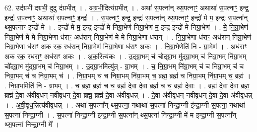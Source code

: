 \documentclass[17pt]{extarticle}
\begin{document}
62. उद॑ग्रभी दग्रभी॒ दुदु द॑ग्रभीत् । . अ॒ग्र॒भी॒दित्य॑ग्रभीत् । . अथा॑ स॒पत्ना᳚न् थ्स॒पत्नाꣳ॒॒ अथाथा॑ स॒पत्नाꣳ॒॒ इन्द्र॒ इन्द्रः॑ स॒पत्नाꣳ॒॒ अथाथा॑ स॒पत्नाꣳ॒॒ इन्द्रः॑ । . स॒पत्नाꣳ॒॒ इन्द्र॒ इन्द्रः॑ स॒पत्ना᳚न् थ्स॒पत्नाꣳ॒॒ इन्द्रो॑ मे म॒ इन्द्रः॑ स॒पत्ना᳚न् थ्स॒पत्नाꣳ॒॒ इन्द्रो॑ मे । . इन्द्रो॑ मे म॒ इन्द्र॒ इन्द्रो॑ मे निग्रा॒भेण॑ निग्रा॒भेण॑ म॒ इन्द्र॒ इन्द्रो॑ मे निग्रा॒भेण॑ । . मे॒ नि॒ग्रा॒भेण॑ निग्रा॒भेण॑ मे मे निग्रा॒भेणा ध॑राꣳ॒॒ अध॑रान् निग्रा॒भेण॑ मे मे निग्रा॒भेणा ध॑रान् । . नि॒ग्रा॒भेणा ध॑राꣳ॒॒ अध॑रान् निग्रा॒भेण॑ निग्रा॒भेणा ध॑राꣳ अक रक॒ रध॑रान् निग्रा॒भेण॑ निग्रा॒भेणा ध॑राꣳ अकः । . नि॒ग्रा॒भेणेति॑ नि - ग्रा॒भेण॑ । . अध॑राꣳ अक रक॒ रध॑राꣳ॒॒ अध॑राꣳ अकः । . अ॒क॒रित्य॑कः । . उ॒द्ग्रा॒भम् च॑ चोद्ग्रा॒भ मु॑द्ग्रा॒भम् च॑ निग्रा॒भम् नि॑ग्रा॒भम् चो᳚द्ग्रा॒भ मु॑द्ग्रा॒भम् च॑ निग्रा॒भम् । . उ॒द्ग्रा॒भमित्यु॑त् - ग्रा॒भम् । . च॒ नि॒ग्रा॒भम् नि॑ग्रा॒भम् च॑ च निग्रा॒भम् च॑ च निग्रा॒भम् च॑ च निग्रा॒भम् च॑ । . नि॒ग्रा॒भम् च॑ च निग्रा॒भम् नि॑ग्रा॒भम् च॒ ब्रह्म॒ ब्रह्म॑ च निग्रा॒भम् नि॑ग्रा॒भम् च॒ ब्रह्म॑ । . नि॒ग्रा॒भमिति॑ नि - ग्रा॒भम् । . च॒ ब्रह्म॒ ब्रह्म॑ च च॒ ब्रह्म॑ दे॒वा दे॒वा ब्रह्म॑ च च॒ ब्रह्म॑ दे॒वाः । . ब्रह्म॑ दे॒वा दे॒वा ब्रह्म॒ ब्रह्म॑ दे॒वा अ॑वीवृधन् नवीवृधन् दे॒वा ब्रह्म॒ ब्रह्म॑ दे॒वा अ॑वीवृधन्न् । . दे॒वा अ॑वीवृधन् नवीवृधन् दे॒वा दे॒वा अ॑वीवृधन्न् । . अ॒वी॒वृ॒ध॒न्नित्य॑वीवृधन्न् । . अथा॑ स॒पत्ना᳚न् थ्स॒पत्ना॒ नथाथा॑ स॒पत्ना॑ निन्द्रा॒ग्नी इ॑न्द्रा॒ग्नी स॒पत्ना॒ नथाथा॑ स॒पत्ना॑ निन्द्रा॒ग्नी । . स॒पत्ना॑ निन्द्रा॒ग्नी इ॑न्द्रा॒ग्नी स॒पत्ना᳚न् थ्स॒पत्ना॑ निन्द्रा॒ग्नी मे॑ म इन्द्रा॒ग्नी स॒पत्ना᳚न् थ्स॒पत्ना॑ निन्द्रा॒ग्नी मे᳚ । \newline
\end{document}
